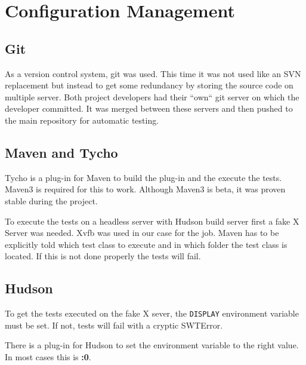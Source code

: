 \section*{Configuration Management}

\subsection*{Git}

As a version control system, git was used. This time it was not used like an SVN
replacement but instead to get some redundancy by storing the source code on
multiple server. Both project developers had their ``own`` git server on which
the developer committed. It was merged between these servers and then pushed to
the main repository for automatic testing.

\subsection*{Maven and Tycho}

Tycho is a plug-in for Maven to build the plug-in and the execute the tests.
Maven3 is required for this to work. Although Maven3 is beta, it was proven
stable during the project.

To execute the tests on a headless server with Hudson build server first a fake
X Server was needed. Xvfb was used in our case for the job. Maven has to be
explicitly told which test class to execute and in which folder the test class
is located. If this is not done properly the tests will fail.

\subsection*{Hudson}

To get the tests executed on the fake X sever, the \texttt{DISPLAY} environment
variable must be set. If not, tests will fail with a cryptic
SWTError.

There is a plug-in for Hudson to set the environment variable to
the right value. In most cases this is \textbf{:0}.